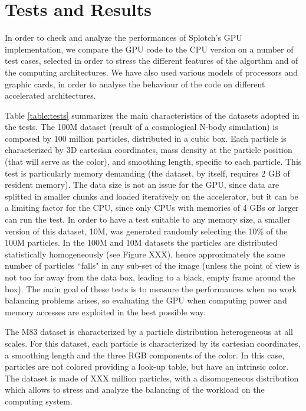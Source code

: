 \documentclass[11pt]{article}
\begin{document}
\section{Tests and Results}

In order to check and analyze the performances of Splotch's GPU implementation,
we compare the GPU code to the CPU version on a number of test cases, selected in 
order to stress the different features of the algorthm and of the computing 
architectures. We have also used various models of processors and graphic cards, in order to analyse
the behaviour of the code on different accelerated architectures.

Table \ref{table:tests} summarizes the main characteristics of the datasets adopted in the 
tests. The 100M dataset (result of a cosmological N-body simulation) 
is composed by 100 million particles, distributed in 
a cubic box. Each particle is characterized by 3D cartesian coordinates,
mass density at the particle position (that will serve as the color),
and smoothing length, specific to each particle. This test is particularly 
memory demanding (the dataset, by itself, requires 2 GB 
of resident memory). The data size is not an issue for the GPU, since data are splitted 
in smaller chunks and loaded iteratively on the accelerator, but it can be a limiting factor
for the CPU, since only CPUs with memories of 4 GBs or larger can run the test. 
In order to have a test suitable to any memory size, a smaller version of this dataset, 10M, was generated 
randomly selecting the 10\% of the 100M particles. 
In the 100M and 10M datasets the particles are distributed 
statistically homogeneously (see Figure XXX), hence approximately the same 
number of particles ``falls" in any sub-set of the image (unless
the point of view is not too far away from the data box, leading to a black, empty 
frame around the box). The main goal of these tests is to measure the performances
when no work balancing problems arises, so evaluating the GPU when computing 
power and memory accesses are exploited in the best possible way. 

The M83 dataset is characterized by a particle distribution 
heterogeneous at all scales. For this dataset, each particle is characterized by its 
cartesian coordinates, a smoothing length and the three RGB components of the color. 
In this case, particles are not colored providing a look-up table,
but have an intrinsic color. The dataset is made of XXX million 
particles, with a  disomogeneous distribution which allows to stress 
and analyze the balancing of the workload on the computing system.
\end{document}
